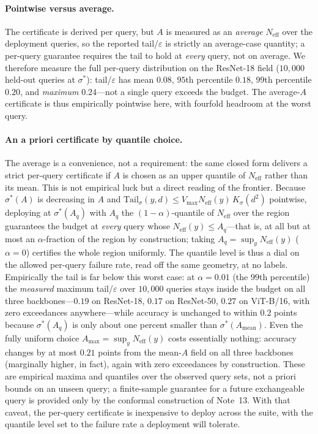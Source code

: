 \documentclass[10pt,twocolumn]{article}
\newcommand{\sstar}{\sigma^{*}}
\newcommand{\Neff}{N_{\mathrm{eff}}}
\begin{document}
\paragraph{Pointwise versus average.} The certificate is derived per query, but $A$ is measured as an \emph{average} $\Neff$ over the deployment queries, so the reported tail/$\varepsilon$ is strictly an average-case quantity; a per-query guarantee requires the tail to hold at \emph{every} query, not on average. We therefore measure the full per-query distribution on the ResNet-18 field ($10{,}000$ held-out queries at $\sstar$): tail/$\varepsilon$ has mean $0.08$, $95$th percentile $0.18$, $99$th percentile $0.20$, and \emph{maximum} $0.24$---not a single query exceeds the budget. The average-$A$ certificate is thus empirically pointwise here, with fourfold headroom at the worst query.

\paragraph{An a priori certificate by quantile choice.} The average is a convenience, not a requirement: the same closed form delivers a strict per-query certificate if $A$ is chosen as an upper quantile of $\Neff$ rather than its mean. This is not empirical luck but a direct reading of the frontier. Because $\sstar(A)$ is decreasing in $A$ and $\mathrm{Tail}_\sigma(y,d)\le V_{\max}\Neff(y)\,K_\sigma(d^2)$ pointwise, deploying at $\sstar(A_q)$ with $A_q$ the $(1-\alpha)$-quantile of $\Neff$ over the region guarantees the budget at \emph{every} query whose $\Neff(y)\le A_q$---that is, at all but at most an $\alpha$-fraction of the region by construction; taking $A_q=\sup_y\Neff(y)$ ($\alpha=0$) certifies the whole region uniformly. The quantile level is thus a dial on the allowed per-query failure rate, read off the same geometry, at no labels. Empirically the tail is far below this worst case: at $\alpha=0.01$ (the $99$th percentile) the \emph{measured} maximum tail/$\varepsilon$ over $10{,}000$ queries stays inside the budget on all three backbones---$0.19$ on ResNet-18, $0.17$ on ResNet-50, $0.27$ on ViT-B/16, with zero exceedances anywhere---while accuracy is unchanged to within $0.2$ points because $\sstar(A_{q})$ is only about one percent smaller than $\sstar(A_{\mathrm{mean}})$. Even the fully uniform choice $A_{\max}=\sup_y\Neff(y)$ costs essentially nothing: accuracy changes by at most $0.21$ points from the mean-$A$ field on all three backbones (marginally higher, in fact), again with zero exceedances by construction. These are empirical maxima and quantiles over the observed query sets, not a priori bounds on an unseen query; a finite-sample guarantee for a future exchangeable query is provided only by the conformal construction of Note~13. With that caveat, the per-query certificate is inexpensive to deploy across the suite, with the quantile level set to the failure rate a deployment will tolerate.
\end{document}
